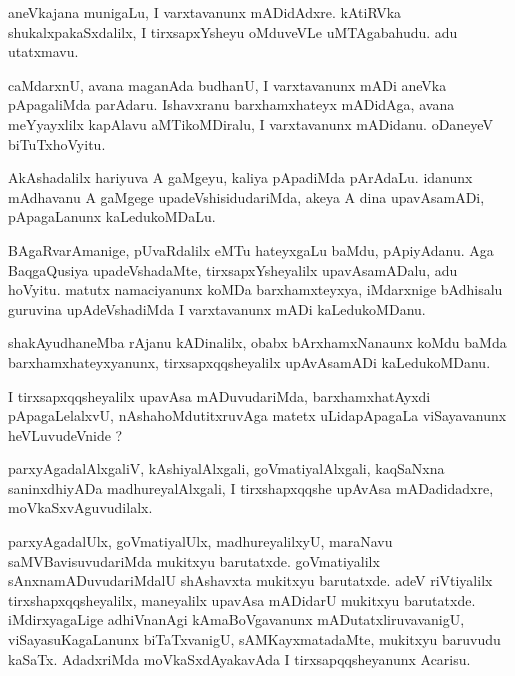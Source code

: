 \documentclass{article}
\begin{document}
\begin{mn}%
aneVkajana munigaLu, I varxtavanunx mADidAdxre. kAtiRVka shukalxpakaSxdalilx, I tirxsapxYsheyu 
oMduveVLe uMTAgabahudu. adu utatxmavu.
\end{mn}

\begin{mn}%
caMdarxnU, avana maganAda budhanU, I varxtavanunx mADi aneVka pApagaliMda parAdaru. Ishavxranu 
barxhamxhateyx mADidAga, avana meYyayxlilx kapAlavu aMTikoMDiralu, I varxtavanunx mADidanu. 
oDaneyeV biTuTxhoVyitu.
\end{mn}

\begin{mn}%
AkAshadalilx hariyuva A gaMgeyu, kaliya pApadiMda pArAdaLu. idanunx mAdhavanu A gaMgege 
upadeVshisidudariMda, akeya A dina upavAsamADi, pApagaLanunx kaLedukoMDaLu.
\end{mn}

\begin{mn}%
BAgaRvarAmanige, pUvaRdalilx eMTu hateyxgaLu baMdu, pApiyAdanu. Aga BaqgaQusiya upadeVshadaMte, 
tirxsapxYsheyalilx upavAsamADalu, adu hoVyitu. matutx namaciyanunx koMDa barxhamxteyxya, 
iMdarxnige bAdhisalu guruvina upAdeVshadiMda I varxtavanunx mADi kaLedukoMDanu.
\end{mn}

\begin{mn}%
shakAyudhaneMba rAjanu kADinalilx, obabx bArxhamxNanaunx koMdu baMda barxhamxhateyxyanunx, 
tirxsapxqqsheyalilx upAvAsamADi kaLedukoMDanu.
\end{mn}

\begin{mn}%
I tirxsapxqqsheyalilx upavAsa mADuvudariMda, barxhamxhatAyxdi pApagaLelalxvU, nAshahoMdutitxruvAga 
matetx uLidapApagaLa viSayavanunx heVLuvudeVnide ?
\end{mn}

\begin{mn}%
parxyAgadalAlxgaliV, kAshiyalAlxgali, goVmatiyalAlxgali, kaqSaNxna saninxdhiyADa madhureyalAlxgali, 
I tirxshapxqqshe upAvAsa mADadidadxre, moVkaSxvAguvudilalx.
\end{mn}

\begin{mn}%
parxyAgadalUlx, goVmatiyalUlx, madhureyalilxyU, maraNavu saMVBavisuvudariMda mukitxyu barutatxde. 
goVmatiyalilx sAnxnamADuvudariMdalU shAshavxta mukitxyu barutatxde. adeV riVtiyalilx 
tirxshapxqqsheyalilx, maneyalilx upavAsa mADidarU mukitxyu barutatxde. iMdirxyagaLige adhiVnanAgi 
kAmaBoVgavanunx mADutatxliruvavanigU, viSayasuKagaLanunx biTaTxvanigU, sAMKayxmatadaMte, mukitxyu 
baruvudu kaSaTx. AdadxriMda moVkaSxdAyakavAda I tirxsapqqsheyanunx Acarisu.
\end{mn}
\end{document}
